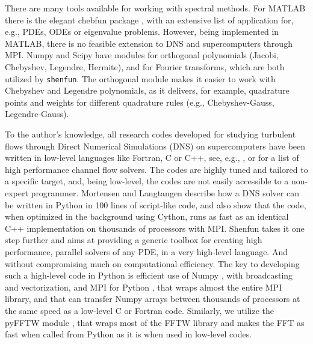 \documentclass[%
oneside,                 %
final,                   %
10pt]{article}
\begin{document}
There are many tools available for working with spectral methods. For MATLAB there is the elegant chebfun package \cite{trefethen13}, with an extensive list of application for, e.g., PDEs, ODEs or eigenvalue problems. However, being implemented in MATLAB, there is no feasible extension to DNS and supercomputers through MPI. Numpy and Scipy have modules for orthogonal polynomials (Jacobi, Chebyshev, Legendre, Hermite), and for Fourier transforms, which are both utilized by \texttt{shenfun}. The orthogonal module makes it easier to work with Chebyshev and Legendre polynomials, as it delivers, for example, quadrature points and weights for different quadrature rules (e.g., Chebyshev-Gauss, Legendre-Gauss). 

To the author's knowledge, all research codes developed for studying turbulent flows through Direct Numerical Simulations (DNS) on supercomputers have been written in low-level languages like Fortran, C or C++, see, e.g., \cite{debruynkops15,hoyas06,leemoser15}, or \cite{Alfonsi2016} for a list of high performance channel flow solvers. The codes are  highly tuned and tailored to a specific target, and, being low-level, the codes are not easily accessible to a non-expert programmer. Mortensen and Langtangen \cite{Mortensen2016} describe how a DNS solver can be written in Python in 100 lines of script-like code, and also show that the code, when optimized in the background using Cython, runs as fast as an identical C++ implementation on thousands of processors with MPI. {Shenfun} takes it one step further and aims at providing a generic toolbox for creating high performance, parallel solvers of any PDE, in a very high-level language. And without compromising much on computational efficiency. The key to developing such a high-level code in Python is efficient use of Numpy \cite{numpy}, with broadcasting and vectorization, and MPI for Python \cite{mpi4py}, that wraps almost the entire MPI library, and that can transfer Numpy arrays between thousands of processors at the same speed as a low-level C or Fortran code. Similarly, we utilize the pyFFTW module \cite{pyfftw}, that wraps most of the FFTW library \cite{libfftw} and makes the FFT as fast when called from Python as it is when used in low-level codes.

\end{document}
